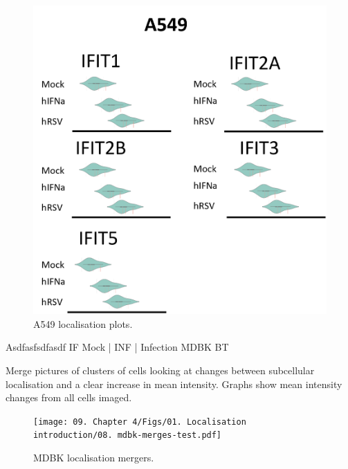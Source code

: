 \begin{figure}
    \centering
    \includegraphics[width=1\linewidth]{09. Chapter 4/Figs/01. Localisation introduction/07. a549 plots.png}
    \caption[A549 localisation plots.]{A549 localisation plots.}
    \label{fig:A549 localisation plots.}
\end{figure}


Asdfasfsdfasdf \newline
IF Mock | INF | Infection \newline
MDBK BT

Merge pictures of clusters of cells looking at changes between subcellular localisation and a clear increase in mean intensity. Graphs show mean intensity changes from all cells imaged.

\begin{figure}
    \centering
    \texttt{[image: 09. Chapter 4/Figs/01. Localisation introduction/08. mdbk-merges-test.pdf]}
    \caption[MDBK localisation mergers.]{MDBK localisation mergers.}
    \label{fig:MDBK localisation mergers}
\end{figure}


